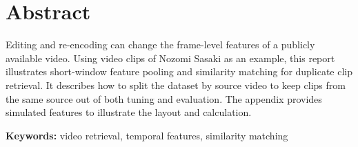 \chapter*{\rmfamily Abstract}

Editing and re-encoding can change the frame-level features of a publicly available video. Using video clips of Nozomi Sasaki as an example, this report illustrates short-window feature pooling and similarity matching for duplicate clip retrieval. It describes how to split the dataset by source video to keep clips from the same source out of both tuning and evaluation. The appendix provides simulated features to illustrate the layout and calculation.

\medskip
\noindent\textbf{Keywords:} video retrieval, temporal features, similarity matching
